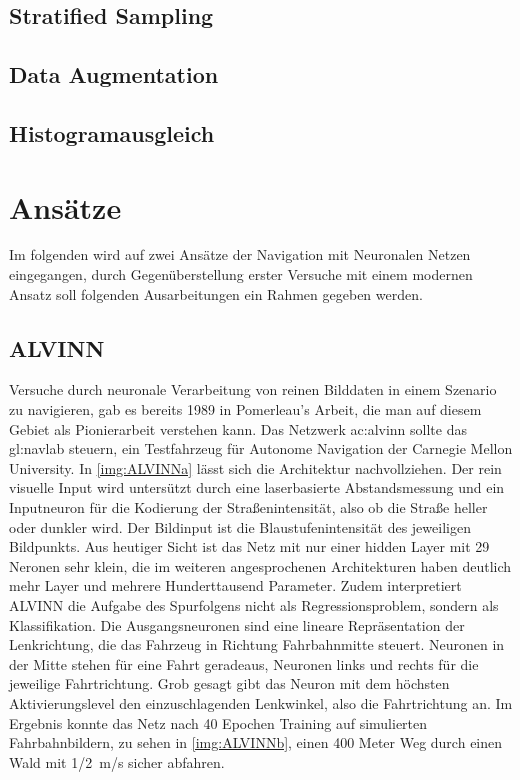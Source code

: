 \subsection{Stratified Sampling}
\subsection{Data Augmentation}
\subsection{Histogramausgleich}


\section{Ansätze}
Im folgenden wird auf zwei Ansätze der Navigation mit Neuronalen Netzen eingegangen, durch Gegenüberstellung erster Versuche mit einem modernen Ansatz soll folgenden Ausarbeitungen ein Rahmen gegeben werden.

\subsection{ALVINN}

Versuche durch neuronale Verarbeitung von reinen Bilddaten in einem Szenario zu navigieren, gab es bereits 1989 in Pomerleau's Arbeit, die man auf diesem Gebiet als Pionierarbeit verstehen kann\cite{pomerleau1989alvinn}.
Das Netzwerk \gls{ac:alvinn} sollte das \gls{gl:navlab} steuern, ein Testfahrzeug für Autonome Navigation der Carnegie Mellon University.
In \ref{img:ALVINNa} lässt sich die Architektur nachvollziehen. 
Der rein visuelle Input wird untersützt durch eine laserbasierte Abstandsmessung und ein Inputneuron für die Kodierung der \glqq Straßenintensität\grqq{}, also ob die Straße heller oder dunkler wird. Der Bildinput ist die Blaustufenintensität des jeweiligen Bildpunkts.
Aus heutiger Sicht ist das Netz mit nur einer hidden Layer mit 29 Neronen sehr klein, die im weiteren angesprochenen Architekturen haben deutlich mehr Layer und mehrere Hunderttausend Parameter. 
Zudem interpretiert ALVINN die Aufgabe des Spurfolgens nicht als Regressionsproblem, sondern als Klassifikation. Die Ausgangsneuronen sind eine lineare Repräsentation der Lenkrichtung, die das Fahrzeug in Richtung Fahrbahnmitte steuert. Neuronen in der Mitte stehen für eine Fahrt geradeaus, Neuronen links und rechts für die jeweilige Fahrtrichtung.
Grob gesagt gibt das Neuron mit dem höchsten Aktivierungslevel den einzuschlagenden Lenkwinkel, also die Fahrtrichtung an.
Im Ergebnis konnte das Netz nach 40 Epochen Training auf simulierten Fahrbahnbildern, zu sehen in \ref{img:ALVINNb}, einen 400 Meter Weg durch einen Wald mit \SI{1/2}{\meter/\second} sicher abfahren.


